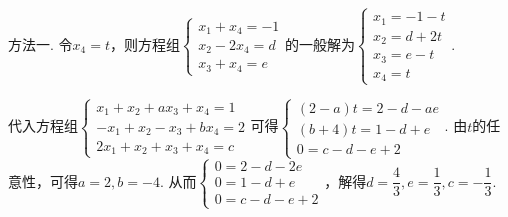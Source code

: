 \documentclass[12pt,fontset=fandol]{ctexart}
\begin{document}
\begin{solve}
方法一. 令$x_4=t$，则方程组$\begin{cases}
                x_1+x_4=-1 \\
                x_2-2x_4=d \\
                x_3+x_4=e
            \end{cases}$的一般解为$\begin{cases}
                x_1=-1-t \\
                x_2=d+2t \\
                x_3=e-t  \\
                x_4=t
            \end{cases}$.

        代入方程组$\begin{cases}
                x_1+x_2+ax_3+x_4=1  \\
                -x_1+x_2-x_3+bx_4=2 \\
                2x_1+x_2+x_3+x_4=c
            \end{cases}$可得$\begin{cases}
                (2-a)t=2-d-ae \\
                (b+4)t=1-d+e  \\
                0=c-d-e+2
            \end{cases}$. 由$t$的任意性，可得$a=2,b=-4$. 从而$\begin{cases}
                0=2-d-2e \\
                0=1-d+e  \\
                0=c-d-e+2
            \end{cases}$，解得$d=\dfrac{4}{3},e=\dfrac{1}{3},c=-\dfrac{1}{3}$.


\end{solve}
\end{document}
